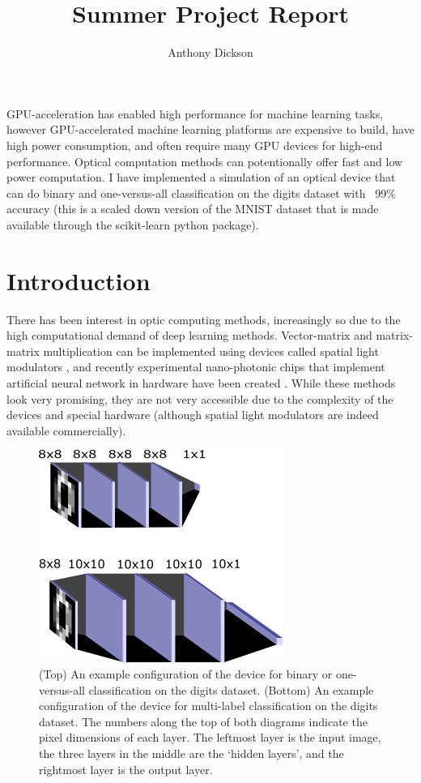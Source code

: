 \documentclass[]{article}
\title{Summer Project Report}
\author{Anthony Dickson}
\begin{document}
\maketitle

GPU-acceleration has enabled high performance for machine learning tasks, however GPU-accelerated machine learning platforms are expensive to build, have high power consumption, and often require many GPU devices for high-end performance. Optical computation methods can potentionally offer fast and low power computation. I have implemented a simulation of an optical device that can do binary and one-versus-all classification on the digits dataset with ~99\% accuracy (this is a scaled down version of the MNIST dataset that is made available through the scikit-learn python package). 

\section{Introduction}
There has been interest in optic computing methods, increasingly so due to the high computational demand of deep learning methods. Vector-matrix and matrix-matrix multiplication can be implemented using devices called spatial light modulators \cite{53402}, and recently experimental nano-photonic chips that implement artificial neural network in hardware have been created \cite{8012714, 03303}. While these methods look very promising, they are not very accessible due to the complexity of the devices and special hardware (although spatial light modulators are indeed available commercially).

\begin{figure}
	\centering
	\includegraphics{../images/device_3d_view}
	\caption{(Top) An example configuration of the device for binary or one-versus-all classification on the digits dataset. (Bottom) An example configuration of the device for multi-label classification on the digits dataset. 
		The numbers along the top of both diagrams indicate the pixel dimensions of each layer. The leftmost layer is the input image, the three layers in the middle are the ‘hidden layers’, and the rightmost layer is the output layer. 
	}
\end{figure}
\end{document}
